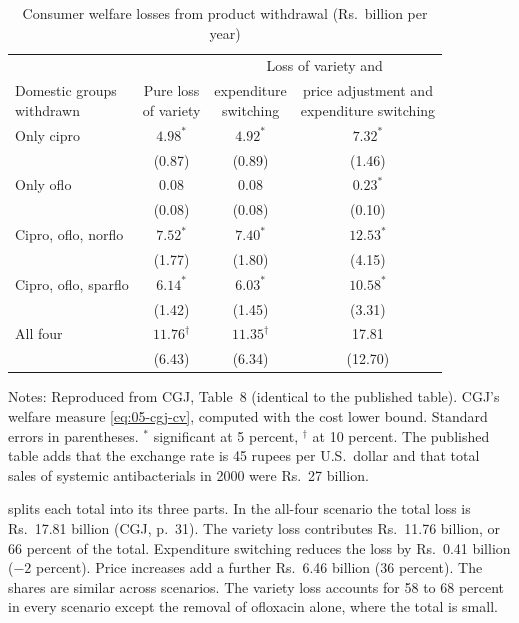 \begin{table}[htbp]
\centering
\caption{Consumer welfare losses from product withdrawal (Rs.\ billion per year)}\label{tab:05-cgj-table8}
\small
\begin{tabular}{lccc}
\toprule
 & & \multicolumn{2}{c}{Loss of variety and} \\
\cmidrule(lr){3-4}
\makecell[l]{Domestic groups\\ withdrawn} & \makecell{Pure loss\\ of variety} & \makecell{expenditure\\ switching} & \makecell{price adjustment and\\ expenditure switching} \\
\midrule
Only cipro & $4.98^{*}$ & $4.92^{*}$ & $7.32^{*}$ \\
 & (0.87) & (0.89) & (1.46) \\
Only oflo & 0.08 & 0.08 & $0.23^{*}$ \\
 & (0.08) & (0.08) & (0.10) \\
Cipro, oflo, norflo & $7.52^{*}$ & $7.40^{*}$ & $12.53^{*}$ \\
 & (1.77) & (1.80) & (4.15) \\
Cipro, oflo, sparflo & $6.14^{*}$ & $6.03^{*}$ & $10.58^{*}$ \\
 & (1.42) & (1.45) & (3.31) \\
All four & $11.76^{\dagger}$ & $11.35^{\dagger}$ & 17.81 \\
 & (6.43) & (6.34) & (12.70) \\
\bottomrule
\end{tabular}
\par\smallskip
\begin{minipage}{0.92\textwidth}\footnotesize
Notes: Reproduced from CGJ, Table~8 (identical to the published table). CGJ's welfare measure \eqref{eq:05-cgj-cv}, computed with the
cost lower bound. Standard errors in parentheses. $^{*}$ significant at 5 percent, $^{\dagger}$ at 10 percent. The
published table adds that the exchange rate is 45 rupees per U.S.\ dollar and that total sales of systemic
antibacterials in 2000 were Rs.~27 billion.
\end{minipage}
\end{table}

 splits each total into its three parts. In the all-four scenario the total loss is
Rs.~17.81 billion (CGJ, p.~31). The variety loss contributes Rs.~11.76 billion, or 66 percent of the total.
Expenditure switching reduces the loss by Rs.~0.41 billion ($-2$ percent). Price increases add a further Rs.~6.46
billion (36 percent). The shares are similar across scenarios. The variety loss accounts for 58 to 68 percent in every
scenario except the removal of ofloxacin alone, where the total is small.

